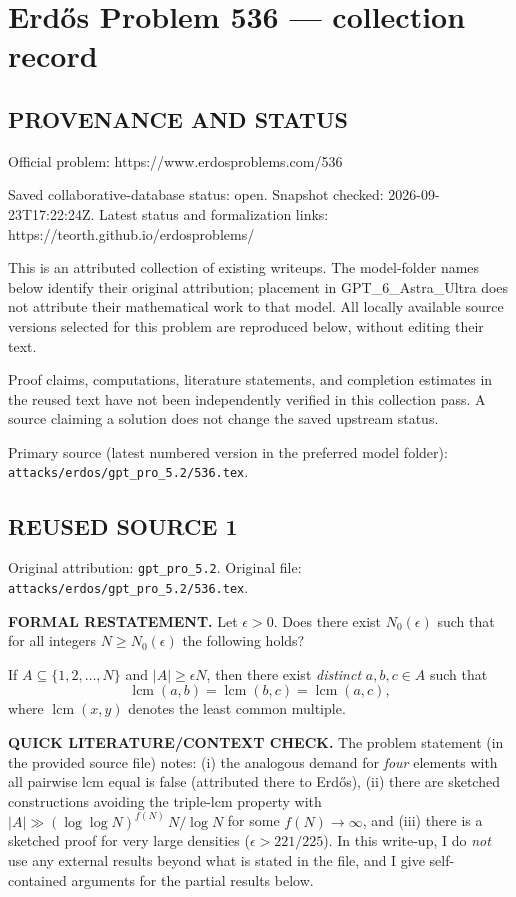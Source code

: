 \section*{Erd\H{o}s Problem 536 --- collection record}

\subsection*{PROVENANCE AND STATUS}
Official problem: https://www.erdosproblems.com/536

Saved collaborative-database status: open.
Snapshot checked: 2026-09-23T17:22:24Z.
Latest status and formalization links: https://teorth.github.io/erdosproblems/

This is an attributed collection of existing writeups. The model-folder names below identify their original attribution; placement in GPT\_6\_Astra\_Ultra does not attribute their mathematical work to that model. All locally available source versions selected for this problem are reproduced below, without editing their text.

Proof claims, computations, literature statements, and completion estimates in the reused text have not been independently verified in this collection pass. A source claiming a solution does not change the saved upstream status.

Primary source (latest numbered version in the preferred model folder): \texttt{attacks/erdos/gpt\_pro\_5.2/536.tex}.

\subsection*{REUSED SOURCE 1}
Original attribution: \texttt{gpt\_pro\_5.2}.
Original file: \texttt{attacks/erdos/gpt\_pro\_5.2/536.tex}.



\noindent\textbf{FORMAL RESTATEMENT.}
Let $\epsilon>0$. Does there exist $N_0(\epsilon)$ such that for all integers $N\ge N_0(\epsilon)$ the following holds?

If $A\subseteq \{1,2,\dots,N\}$ and $|A|\ge \epsilon N$, then there exist \emph{distinct} $a,b,c\in A$ such that
\[
\operatorname{lcm}(a,b)=\operatorname{lcm}(b,c)=\operatorname{lcm}(a,c),
\]
where $\operatorname{lcm}(x,y)$ denotes the least common multiple.

\noindent\textbf{QUICK LITERATURE/CONTEXT CHECK.}
The problem statement (in the provided source file) notes:
(i) the analogous demand for \emph{four} elements with all pairwise lcm equal is false (attributed there to Erd\H{o}s),
(ii) there are sketched constructions avoiding the triple-lcm property with $|A|\gg (\log\log N)^{f(N)}\,N/\log N$ for some $f(N)\to\infty$, and
(iii) there is a sketched proof for very large densities ($\epsilon>221/225$).
In this write-up, I do \emph{not} use any external results beyond what is stated in the file, and I give self-contained arguments for the partial results below.

